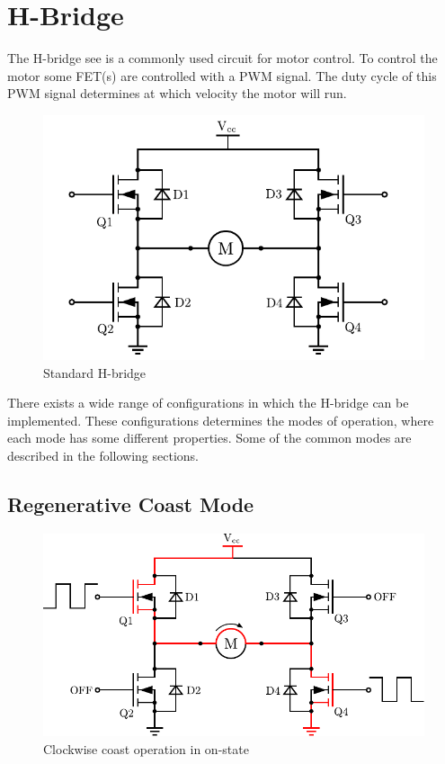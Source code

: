 \section{H-Bridge}
The H-bridge see  is a commonly used circuit for motor control. To control the motor some FET(s) are controlled with a PWM signal. The duty cycle of this PWM signal determines at which velocity the motor will run.

\begin{figure}[H]
	\centering
	\includegraphics[scale=.6]{figures/Hbridge.pdf}
	\flushleft
	\caption{Standard H-bridge}
	\label{Hbridge}
\end{figure}


There exists a wide range of configurations in which the H-bridge can be implemented. These configurations determines the modes of operation, where each mode has some different properties. Some of the common modes are described in the following sections.

\subsection{Regenerative Coast Mode}

\begin{figure}[H]
	\centering
	\includegraphics[scale=.6]{figures/HbridgeClockwiseCoastON.pdf}
	\flushleft
	\caption{Clockwise coast operation in on-state}
	\label{figures/HbridgeClokwiseCoastON}
\end{figure}

